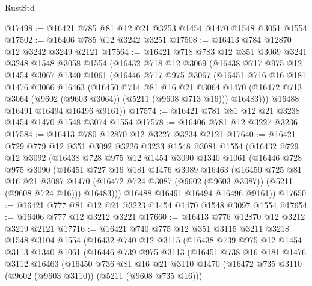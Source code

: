\begin{lexlean}{RustStd}
\begin{coremodule}
@17498 := @16421 @785 @81 @12 @21 @3253 @1454 @1470 @1548 @3051 @1554
@17502 := @16406 @785 @12 @3242 @3251
@17508 := @16413 @784 @12870 @12 @3242 @3249 @2121
@17564 := @16421
    @718
    @783
    @12
    @351
    @3069
    @3241
    @3248
    @1548
    @3058
    @1554
    (@16432
      @718
      @12
      @3069
      (@16438
        @717
        @975
        @12
        @1454
        @3067
        @1340
        @1061
        (@16446
          @717
          @975
          @3067
          (@16451
            @716
            @16
            @181
            @1476
            @3066
            @16463
            (@16450
              @714
              @81
              @16
              @21
              @3064
              @1470
              (@16472 @713 @3064 (@9602 (@9603 @3064)) (@5211 (@9608 @713 @16)))
              @16483)))
        @16488
        @16491
        @16494
        @16496
        @9161))
@17574 := @16421 @781 @81 @12 @21 @3238 @1454 @1470 @1548 @3074 @1554
@17578 := @16406 @781 @12 @3227 @3236
@17584 := @16413 @780 @12870 @12 @3227 @3234 @2121
@17640 := @16421
    @729
    @779
    @12
    @351
    @3092
    @3226
    @3233
    @1548
    @3081
    @1554
    (@16432
      @729
      @12
      @3092
      (@16438
        @728
        @975
        @12
        @1454
        @3090
        @1340
        @1061
        (@16446
          @728
          @975
          @3090
          (@16451
            @727
            @16
            @181
            @1476
            @3089
            @16463
            (@16450
              @725
              @81
              @16
              @21
              @3087
              @1470
              (@16472 @724 @3087 (@9602 (@9603 @3087)) (@5211 (@9608 @724 @16)))
              @16483)))
        @16488
        @16491
        @16494
        @16496
        @9161))
@17650 := @16421 @777 @81 @12 @21 @3223 @1454 @1470 @1548 @3097 @1554
@17654 := @16406 @777 @12 @3212 @3221
@17660 := @16413 @776 @12870 @12 @3212 @3219 @2121
@17716 := @16421
    @740
    @775
    @12
    @351
    @3115
    @3211
    @3218
    @1548
    @3104
    @1554
    (@16432
      @740
      @12
      @3115
      (@16438
        @739
        @975
        @12
        @1454
        @3113
        @1340
        @1061
        (@16446
          @739
          @975
          @3113
          (@16451
            @738
            @16
            @181
            @1476
            @3112
            @16463
            (@16450
              @736
              @81
              @16
              @21
              @3110
              @1470
              (@16472 @735 @3110 (@9602 (@9603 @3110)) (@5211 (@9608 @735 @16)))

\end{coremodule}
\end{lexlean}
